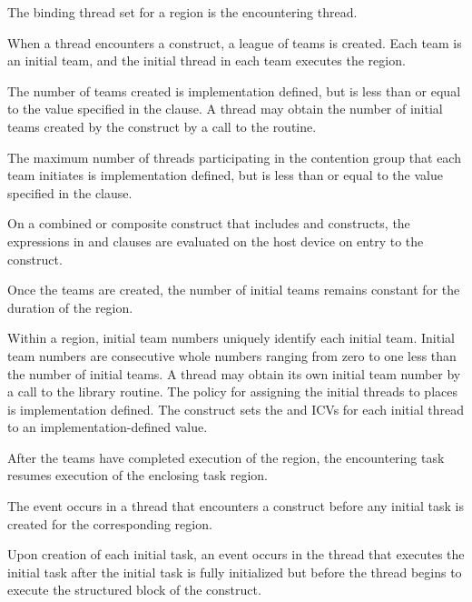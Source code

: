 \begin{samepage}

\binding
The binding thread set for a  region is the encountering thread.

\descr
When a thread encounters a  construct, a league of teams is
created. Each team is an initial team, and the initial thread in each team
executes the  region.

The number of teams created is implementation defined, but is less than or 
equal to the value specified in the  clause. A thread may 
obtain the number of initial teams created by the construct by a call to 
the  routine.

\end{samepage}

The maximum number of threads participating in the contention group that 
each team initiates is implementation defined, but is less than or equal 
to the value specified in the  clause.

On a combined or composite construct that includes  and
 constructs, the expressions in  and
 clauses are evaluated on the host device on
entry to the  construct.

Once the teams are created, the number of initial teams remains constant 
for the duration of the  region.

Within a  region, initial team numbers uniquely identify each
initial team. Initial team numbers are consecutive whole numbers ranging 
from zero to one less than the number of initial teams. A thread may obtain 
its own initial team number by a call to the  library
routine. The policy for assigning the initial threads to places is 
implementation defined. The  construct sets the 
 and  ICVs for each initial 
thread to an implementation-defined value.

After the teams have completed execution of the  region, the 
encountering task resumes execution of the enclosing task region.

\events

The  event occurs in a thread that encounters a
 construct before any initial task is created for the
corresponding  region.

Upon creation of each initial task, an  event
occurs in the thread that executes the initial task after the initial
task is fully initialized but before the thread begins to execute the
structured block of the  construct.

